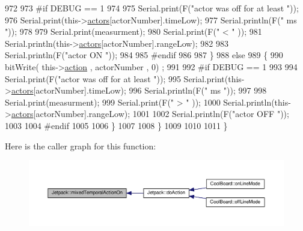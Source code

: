 \begin{DoxyCode}
972 
973 \textcolor{preprocessor}{        #if DEBUG == 1 }
974 
975             Serial.print(F(\textcolor{stringliteral}{"actor was off for at least "}));
976             Serial.print(this->\hyperlink{class_jetpack_a7e16d2f97837f9712a2e6de1c50d99db}{actors}[actorNumber].timeLow);
977             Serial.println(F(\textcolor{stringliteral}{" ms "}));
978 
979             Serial.print(measurment);
980             Serial.print(F(\textcolor{stringliteral}{" < "} ));
981             Serial.println(this->\hyperlink{class_jetpack_a7e16d2f97837f9712a2e6de1c50d99db}{actors}[actorNumber].rangeLow);
982     
983             Serial.println(F(\textcolor{stringliteral}{"actor ON "}));
984     
985 \textcolor{preprocessor}{        #endif  }
986 
987         \}
988         \textcolor{keywordflow}{else} 
989         \{
990             bitWrite( this->\hyperlink{class_jetpack_aca3142925a7b0834b34ae91d26af7765}{action} , actorNumber , 0) ;   
991 
992 \textcolor{preprocessor}{        #if DEBUG == 1 }
993 
994             Serial.print(F(\textcolor{stringliteral}{"actor was off for at least "}));
995             Serial.print(this->\hyperlink{class_jetpack_a7e16d2f97837f9712a2e6de1c50d99db}{actors}[actorNumber].timeLow);
996             Serial.println(F(\textcolor{stringliteral}{" ms "}));
997 
998             Serial.print(measurment);
999             Serial.print(F(\textcolor{stringliteral}{" > "} ));
1000             Serial.println(this->\hyperlink{class_jetpack_a7e16d2f97837f9712a2e6de1c50d99db}{actors}[actorNumber].rangeLow);
1001 
1002             Serial.println(F(\textcolor{stringliteral}{"actor OFF "}));
1003     
1004 \textcolor{preprocessor}{        #endif              }
1005 
1006         \}
1007 
1008     \}
1009 
1010     
1011 \}
\end{DoxyCode}
Here is the caller graph for this function\+:
\nopagebreak
\begin{figure}[H]
\begin{center}
\leavevmode
\includegraphics[width=350pt]{df/d1d/class_jetpack_af44bc8a08818e4433dfb1c7104601f12_icgraph}
\end{center}
\end{figure}
\mbox{\label{class_jetpack_a65ce9533c39fa71e4945b970bf14b980}} 
